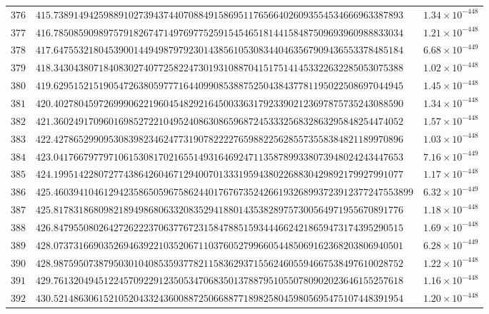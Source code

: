 \documentclass[12pt,reqno]{amsart}
\theoremstyle{remark}
\begin{document}
\begin{longtable}{clc}
$376$ & $415.7389149425988910273943744070884915869511765664026093554534666963387893$ & $1.34\times 10^{-448}$ \\
$377$ & $416.7850859098975791826747149769775259154546518144158487509693960988833034$ & $1.21\times 10^{-448}$ \\
$378$ & $417.6475532180453900144949879792301438561053083440463567909436553378485184$ & $6.68\times 10^{-449}$ \\
$379$ & $418.3430438071840830274077258224730193108870415175141453322632285053075388$ & $1.02\times 10^{-448}$ \\
$380$ & $419.6295152151905472638059777164409908538875250438437781195022508697044945$ & $1.45\times 10^{-448}$ \\
$381$ & $420.4027804597269990622196045482921645003363179233902123697875735243088590$ & $1.34\times 10^{-448}$ \\
$382$ & $421.3602491709601698527221049524086308659687245333256832863295848254474052$ & $1.57\times 10^{-448}$ \\
$383$ & $422.4278652990953083982346247731907822227659882256285573558384821189970896$ & $1.03\times 10^{-448}$ \\
$384$ & $423.0417667977971061530817021655149316469247113587899338073948024243447653$ & $7.16\times 10^{-449}$ \\
$385$ & $424.1995142280727743864260467129400701333195943802268830429892179927991077$ & $1.17\times 10^{-448}$ \\
$386$ & $425.460394104612942358650596758624401767673524266193268993723912377247553899$ & $6.32\times 10^{-449}$ \\
$387$ & $425.8178318680982189498680633208352941880143538289757300564971955670891776$ & $1.18\times 10^{-448}$ \\
$388$ & $426.8479550802642726222370637767231584788515934446624218659473174395290515$ & $1.69\times 10^{-448}$ \\
$389$ & $428.0737316690352694639221035206711037605279966054485069162368203806940501$ & $6.28\times 10^{-449}$ \\
$390$ & $428.9875950738795030104085359377821158362937155624605594667538497610028752$ & $1.22\times 10^{-448}$ \\
$391$ & $429.7613204945122457092291235053470683501378879510550780902023646155257618$ & $1.16\times 10^{-448}$ \\
$392$ & $430.5214863061521052043324360088725066887718982580459805695475107448391954$ & $1.20\times 10^{-448}$ \\

\end{longtable}
\end{document}
